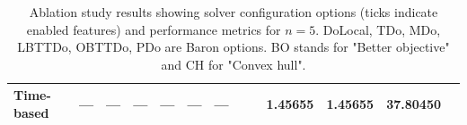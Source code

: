 \documentclass[11pt,reqno,a4paper]{amsart}
\numberwithin{equation}{section}
\theoremstyle{mytheorem}
\theoremstyle{myremark}
\theoremstyle{myparagraph}
\newcommand{\yes}{\ding{51}}
\newcommand{\no}{\ding{55}}
\newcommand{\na}{---} %
\begin{document}
\begin{table}[ht]
\begin{threeparttable}
\begin{tabular}{l c c c c c c c c c r r r}
                 Time-based           & \na              & \na          & \na          & \na             & \na             & \na          & \yes                & \no                  & 1.45655         & 1.45655         & 37.80450          \\
                \bottomrule
            \end{tabular}
            \begin{tablenotes}
                \footnotesize
            \end{tablenotes}
        \end{threeparttable}
        \caption{Ablation study results showing solver configuration options (ticks indicate enabled features) and performance metrics for $n=5$.
        DoLocal, TDo, MDo, LBTTDo, OBTTDo, PDo are Baron options. BO stands for "Better objective" and CH for "Convex hull".}
        \label{tab:ablation_configs}
    \end{table}

    \newpage
    \printbibliography
\end{document}
